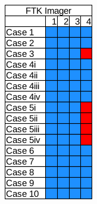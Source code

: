 \begin{figure}[h!]
\begin{subfigure}{0.17\linewidth}
    \end{subfigure}~~
    \begin{subfigure}{0.17\linewidth}
        \includegraphics[width=\linewidth]{fig/ftk_results_fat.png}

\end{subfigure}
\end{figure}
